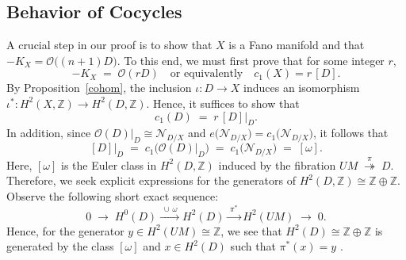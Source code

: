 \documentclass[a4paper, 12pt]{article}
\newcommand{\oX}{X}
\newcommand{\bZ}{\mathbb{Z}}
\newcommand{\cO}{\mathcal{O}}
\newcommand{\cN}{\mathcal{N}}
\begin{document}
\subsection{Behavior of Cocycles}\label{sec-cocycle}
A crucial step in our proof is to show that $\oX$ is a Fano manifold and that $-K_{\oX} = \cO\bigl((n+1)D\bigr)$. To this end, we must first prove that for some integer $r$, 
\[
-K_{\oX} \;=\;\cO(rD)
\quad\text{or equivalently}\quad
c_1(\oX)=r\,[D].
\]
By Proposition~\ref{cohom}, the inclusion \(\iota:D\rightarrow\oX\) induces an isomorphism 
\(\iota^*:H^2(\oX,\bZ)\rightarrow H^2(D,\bZ)\). Hence, it suffices to show that
\[
c_1(D)\;=\;r\,[D]\bigl|_D.
\]
In addition, since \(\cO(D)\bigl|_D \cong \cN_{D/\oX}\) and \(e\bigl(\cN_{D/\oX}\bigr)=c_1\bigl(\cN_{D/\oX}\bigr)\), it follows that
\[
[D]\bigl|_D
\;=\;
c_1\bigl(\cO(D)\bigl|_D\bigr)
\;=\;
c_1\bigl(\cN_{D/\oX}\bigr)
\;=\;
[\omega].
\]
Here, $[\omega]$ is the Euler class in $H^2(D,\bZ)$ induced by the fibration $UM \;\overset{\pi}{\twoheadrightarrow}\; D$. Therefore, we seek explicit expressions for the generators of \(H^2(D,\bZ)\cong \bZ\oplus \bZ\). Observe the following short exact sequence:
\[
0
\;\longrightarrow\;
H^0(D)
\xrightarrow{\;\cup\,\omega\;}
H^2(D)
\xrightarrow{\;\pi^*\;}
H^2(UM)
\;\longrightarrow\;
0.
\]
Hence, for the generator \(y\in H^2(UM)\cong \bZ\), we see that \(H^2(D)\cong \bZ\oplus \bZ\) is generated by the class \([\omega]\) and \(x\in H^2(D)\) such that \(\pi^*(x)=y\) . 
\end{document}
